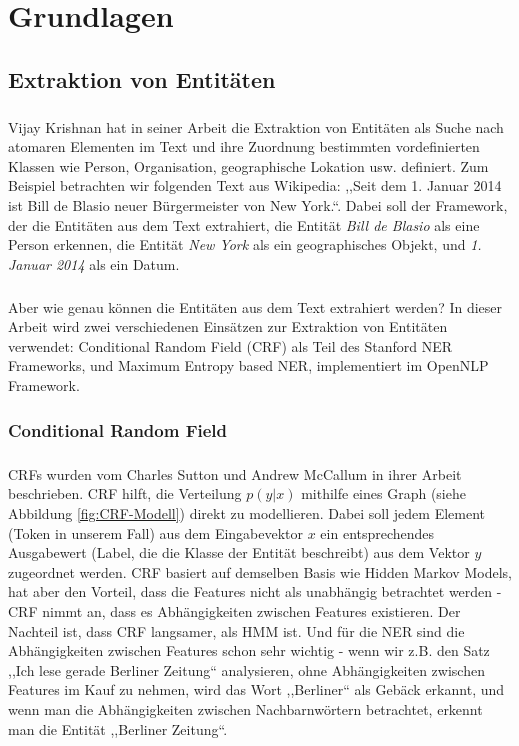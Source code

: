 \chapter{Grundlagen}
\label{sec:Grundlagen}

\section{Extraktion von Entitäten}
\paragraph{}
Vijay Krishnan hat in seiner Arbeit\cite{Vijay/Vignesh:05} die Extraktion von Entitäten als Suche nach atomaren Elementen im Text und ihre Zuordnung bestimmten vordefinierten Klassen wie Person, Organisation, geographische Lokation usw. definiert. Zum Beispiel betrachten wir folgenden Text aus Wikipedia: ,,Seit dem 1. Januar 2014 ist Bill de Blasio neuer Bürgermeister von New York.``. Dabei soll der Framework, der die Entitäten aus dem Text extrahiert, die Entität \textit{Bill de Blasio} als eine Person erkennen, die Entität \textit{New York} als ein geographisches Objekt, und \textit{1. Januar 2014} als ein Datum.

\paragraph{}
Aber wie genau können die Entitäten aus dem Text extrahiert werden? In dieser Arbeit wird zwei verschiedenen Einsätzen zur Extraktion von Entitäten verwendet: Conditional Random Field (CRF) als Teil des Stanford NER Frameworks, und Maximum Entropy based NER, implementiert im OpenNLP Framework.

\subsection{Conditional Random Field}
\paragraph{}
CRFs wurden vom Charles Sutton und Andrew McCallum in ihrer Arbeit\cite{Charles/Andrew:10} beschrieben. CRF hilft, die Verteilung $p(y|x)$ mithilfe eines Graph (siehe Abbildung \ref{fig:CRF-Modell}) direkt zu modellieren. Dabei soll jedem Element (Token in unserem Fall) aus dem Eingabevektor $x$ ein entsprechendes Ausgabewert (Label, die die Klasse der Entität beschreibt) aus dem Vektor $y$ zugeordnet werden. CRF basiert auf demselben Basis wie Hidden Markov Models, hat aber den Vorteil, dass die Features nicht als unabhängig betrachtet werden - CRF nimmt an, dass es Abhängigkeiten zwischen Features existieren. Der Nachteil ist, dass CRF langsamer, als HMM ist. Und für die NER sind die Abhängigkeiten zwischen Features schon sehr wichtig - wenn wir z.B. den Satz ,,Ich lese gerade Berliner Zeitung`` analysieren, ohne Abhängigkeiten zwischen Features im Kauf zu nehmen, wird das Wort ,,Berliner`` als Gebäck erkannt, und wenn man die Abhängigkeiten zwischen Nachbarnwörtern betrachtet, erkennt man die Entität ,,Berliner Zeitung``.

